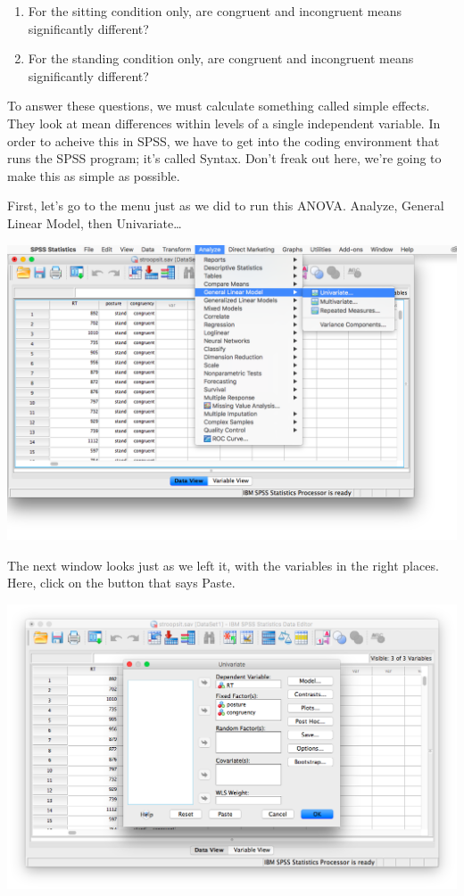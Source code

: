 \documentclass[
]{book}
\providecommand{\tightlist}{%
  \setlength{\itemsep}{0pt}\setlength{\parskip}{0pt}}
\begin{document}
\begin{enumerate}
\def\labelenumi{\arabic{enumi}.}
\tightlist
\item
  For the sitting condition only, are congruent and incongruent means significantly different?
\item
  For the standing condition only, are congruent and incongruent means significantly different?
\end{enumerate}

To answer these questions, we must calculate something called simple effects. They look at mean differences within levels of a single independent variable. In order to acheive this in SPSS, we have to get into the coding environment that runs the SPSS program; it's called Syntax. Don't freak out here, we're going to make this as simple as possible.

First, let's go to the menu just as we did to run this ANOVA. {Analyze}, {General Linear Model}, then {Univariate\ldots{}}

\includegraphics{img/10.4.18.png}

The next window looks just as we left it, with the variables in the right places. Here, click on the button that says {Paste}.

\includegraphics{img/10.4.19.png}
\end{document}
